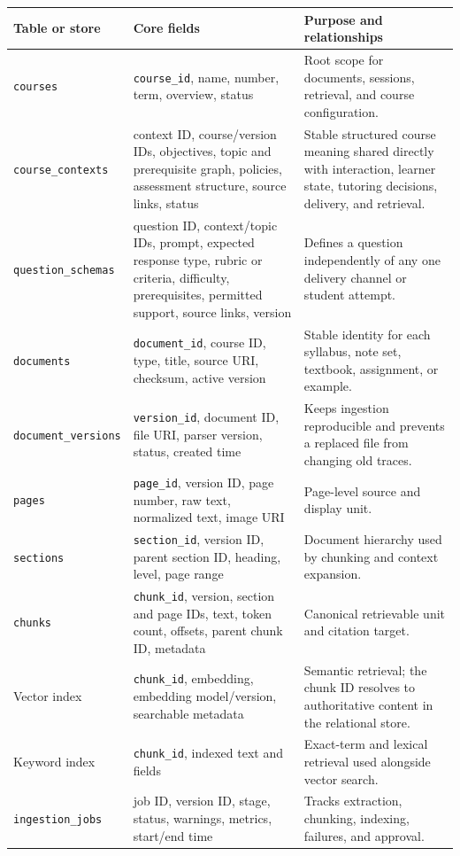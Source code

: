 \documentclass[11pt]{article}
\begin{document}
\small
\begin{longtable}{@{}p{}p{}p{}@{}}
\toprule
\textbf{Table or store} & \textbf{Core fields} & \textbf{Purpose and relationships} \\
\midrule
\endhead
\texttt{courses} & \texttt{course\_id}, name, number, term, overview, status & Root scope for documents, sessions, retrieval, and course configuration. \\
\texttt{course\_contexts} & context ID, course/version IDs, objectives, topic and prerequisite graph, policies, assessment structure, source links, status & Stable structured course meaning shared directly with interaction, learner state, tutoring decisions, delivery, and retrieval. \\
\texttt{question\_schemas} & question ID, context/topic IDs, prompt, expected response type, rubric or criteria, difficulty, prerequisites, permitted support, source links, version & Defines a question independently of any one delivery channel or student attempt. \\
\texttt{documents} & \texttt{document\_id}, course ID, type, title, source URI, checksum, active version & Stable identity for each syllabus, note set, textbook, assignment, or example. \\
\texttt{document\_versions} & \texttt{version\_id}, document ID, file URI, parser version, status, created time & Keeps ingestion reproducible and prevents a replaced file from changing old traces. \\
\texttt{pages} & \texttt{page\_id}, version ID, page number, raw text, normalized text, image URI & Page-level source and display unit. \\
\texttt{sections} & \texttt{section\_id}, version ID, parent section ID, heading, level, page range & Document hierarchy used by chunking and context expansion. \\
\texttt{chunks} & \texttt{chunk\_id}, version, section and page IDs, text, token count, offsets, parent chunk ID, metadata & Canonical retrievable unit and citation target. \\
Vector index & \texttt{chunk\_id}, embedding, embedding model/version, searchable metadata & Semantic retrieval; the chunk ID resolves to authoritative content in the relational store. \\
Keyword index & \texttt{chunk\_id}, indexed text and fields & Exact-term and lexical retrieval used alongside vector search. \\
\texttt{ingestion\_jobs} & job ID, version ID, stage, status, warnings, metrics, start/end time & Tracks extraction, chunking, indexing, failures, and approval. \\

\end{longtable}
\end{document}

